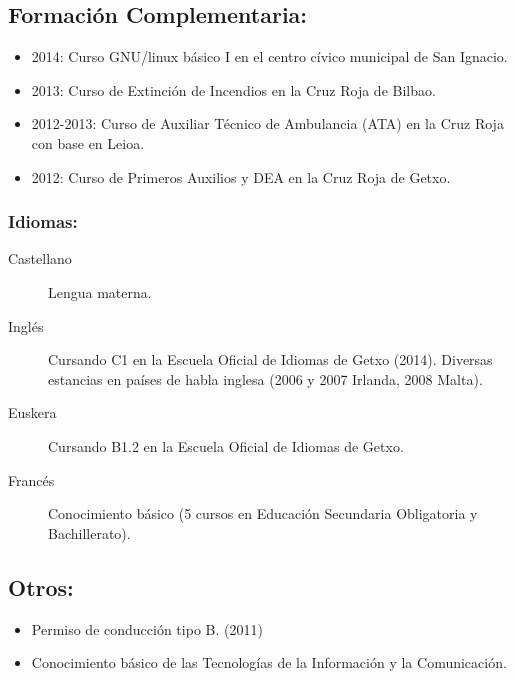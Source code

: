 \documentclass[10pt,a4paper,notitlepage]{article}
\begin{document}
\subsection*{Formación Complementaria:}
\begin{itemize}
  \item 2014: Curso GNU/linux básico I en el centro cívico municipal de San Ignacio.
  \item 2013: Curso de Extinción de Incendios en la Cruz Roja de Bilbao.
  \item 2012-2013: Curso de Auxiliar Técnico de Ambulancia (ATA) en la Cruz Roja con base en Leioa.
  \item 2012: Curso de Primeros Auxilios y DEA en la Cruz Roja de Getxo.
\end{itemize}

\subsubsection*{Idiomas:}
\begin{description}
  \item [Castellano] Lengua materna.
  \item [Inglés] Cursando C1 en la Escuela Oficial de Idiomas de Getxo (2014). Diversas estancias en países de habla inglesa (2006 y 2007 Irlanda, 2008 Malta).
  \item [Euskera] Cursando B1.2 en la Escuela Oficial de Idiomas de Getxo.
  \item [Francés] Conocimiento básico (5 cursos en Educación Secundaria Obligatoria y Bachillerato).
\end{description}

\subsection*{Otros:}
\begin{itemize}
\item Permiso de conducción tipo B. (2011)
\item Conocimiento básico de las Tecnologías de la Información y la Comunicación.
\end{itemize}
\end{document}
